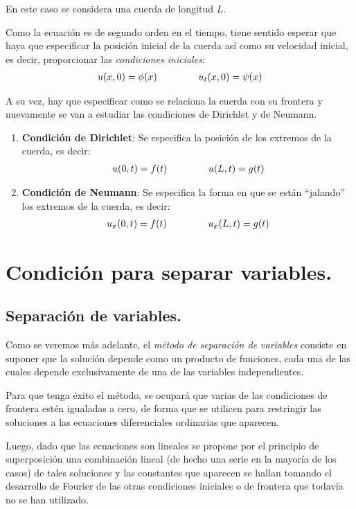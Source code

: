 En este caso se considera una cuerda de longitud $L$.

Como la ecuación es de segundo orden en el tiempo, tiene sentido esperar que haya que especificar la posición inicial de la cuerda así como su velocidad inicial, es decir, proporcionar las \emph{condiciones iniciales}:
\begin{align}
u(x, 0) = \phi (x) \hspace{1.5cm} u_{t}(x, 0) = \psi (x)
\label{eq:ecuacion_06_02_07}
\end{align}

A su vez, hay que especificar como se relaciona la cuerda con su frontera y nuevamente se van a estudiar las condiciones de Dirichlet y de Neumann.

\begin{enumerate}
\item \textbf{Condición de Dirichlet}:
Se especifica la posición de los extremos de la cuerda, es decir:
\begin{align}
u(0, t) = f (t) \hspace{1.5cm} u(L, t) = g(t)
\label{eq:ecuacion_06_02_08}   
\end{align}
\item \textbf{Condición de Neumann}:
Se especifica la forma en que se están \enquote{jalando} los extremos de la cuerda, es decir:
\begin{align}
u_{x}(0, t) = f(t) \hspace{1.5cm} u_{x}(L,t) = g(t)
\label{eq:ecuacion_06_02_09}    
\end{align}
\end{enumerate}


\section{Condición para separar variables.}
\subsection{Separación de variables.}

Como se veremos más adelante, el \emph{método de separación de variables} consiste en suponer que la solución depende como un producto de funciones, cada una de las cuales depende exclusivamente de una de las variables independientes.
\par
Para que tenga éxito el método, se ocupará que varias de las condiciones de frontera estén igualadas a cero, de forma que se utilicen para restringir las soluciones a las ecuaciones diferenciales ordinarias que aparecen.
\par
Luego, dado que las ecuaciones son lineales se propone por el principio de superposición una combinación lineal (de hecho una serie en la mayoría de los casos) de tales soluciones y las constantes que aparecen se hallan tomando el desarrollo de Fourier de las otras condiciones iniciales o de frontera que todavía no se han utilizado.

